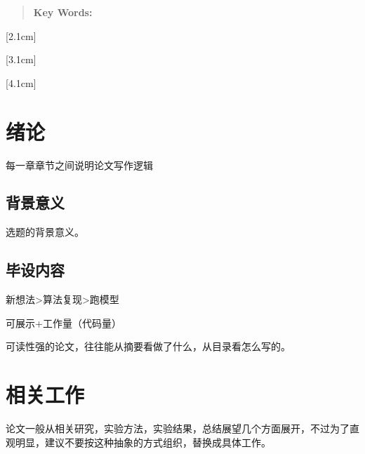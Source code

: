 \documentclass[12pt]{ctexart}
\begin{document}
\begin{spacing}{1.5}
\begin{abstract}
	\qquad  \textbf{Key Words:}
\end{abstract}
\clearpage%
\pagestyle{fancy}
\lhead{} \chead{\leftmark} \rhead{}
\lfoot{} \cfoot{\thepage} \rfoot{}
\renewcommand\headrulewidth{0.3pt}
[2.1cm]{\bfseries {} \vspace{5pt}}{\contentslabel{4em}}{\hspace*{-4em}}{~~\contentspage}

[3.1cm]{}{\contentslabel{4em}}{\hspace*{-2em}}{~~\contentspage}

[4.1cm]{}{\contentslabel{4em}}{\hspace*{-2em}}{~~\contentspage}


\tableofcontents %
\clearpage
\setcounter{page}{1}
\section{绪论}
每一章章节之间说明论文写作逻辑
\subsection{背景意义}
选题的背景意义。
\subsection{毕设内容}
新想法>算法复现>跑模型

可展示+工作量（代码量）

可读性强的论文，往往能从摘要看做了什么，从目录看怎么写的。
\clearpage
\section{相关工作}
论文一般从相关研究，实验方法，实验结果，总结展望几个方面展开，不过为了直观明显，建议不要按这种抽象的方式组织，替换成具体工作。

\end{spacing}
\end{document}
